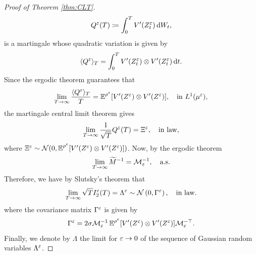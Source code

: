 \documentclass[10pt]{article}
\begin{document}
\begin{proof}[Proof of Theorem \ref{thm:CLT}]
	\begin{equation}
	Q^\varepsilon(T) \coloneqq \int_0^T V'(Z^\varepsilon_t) \,\mathrm{d} W_t,
	\end{equation}
	is a martingale whose quadratic variation is given by
	\begin{equation}
	\langle Q^\varepsilon \rangle_T = \int_0^T V'(Z^\varepsilon_t) \otimes V'(Z^\varepsilon_t) \,\mathrm{d} t. 
	\end{equation}
	Since the ergodic theorem guarantees that 
	\begin{equation}
	\lim_{T\to\infty}\frac{\langle Q^\varepsilon \rangle_T}{T} = \operatorname{\mathbb{E}}^{\rho^\varepsilon}[V'(Z^\varepsilon) \otimes V'(Z^\varepsilon)], \quad \text{in } L^1(\mu^\varepsilon),
	\end{equation}
	the martingale central limit theorem gives 
	\begin{equation}
	\lim_{T\to\infty}\frac{1}{\sqrt{T}} Q^\varepsilon(T) = \Xi^\varepsilon, \quad \text{in law},
	\end{equation}
	where $\Xi^\varepsilon \sim \mathcal N(0, \operatorname{\mathbb{E}}^{\rho^\varepsilon}[V'(Z^\varepsilon) \otimes V'(Z^\varepsilon)])$.
	Now, by the ergodic theorem 
	\begin{equation}
	\lim_{T \to \infty} \widetilde M^{-1} = \mathcal M_\varepsilon^{-1}, \quad \text{a.s.}
	\end{equation}
	Therefore, we have by Slutsky's theorem that
	\begin{equation}
	\lim_{T \to \infty} \sqrt{T} I_2^\varepsilon(T) = \Lambda^\varepsilon \sim \mathcal N\left(0, \Gamma^\varepsilon\right), \quad \text{in law}.
	\end{equation}
	where the covariance matrix $\Gamma^\varepsilon$ is given by
	\begin{equation}
	\Gamma^\varepsilon = 2\sigma \mathcal M_\varepsilon^{-1}\operatorname{\mathbb{E}}^{\rho^\varepsilon}[V'(Z^\varepsilon) \otimes V'(Z^\varepsilon)]\mathcal M_\varepsilon^{-\top}.
	\end{equation}
	Finally, we denote by $\Lambda$ the limit for $\varepsilon \to 0$ of the sequence of Gaussian random variables $\Lambda^\varepsilon$.
	

\end{proof}
\end{document}
